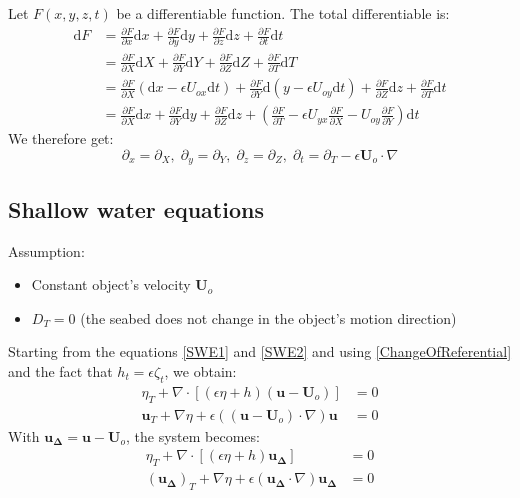 \documentclass[11pt,a4paper]{article}
\begin{document}
	Let $F(x,y,z,t)$ be a differentiable function. The total differentiable is: 
	\begin{align*}
		\mathrm{d}F &= \frac{\partial F}{\partial x} \mathrm{d}x + \frac{\partial F}{\partial y} \mathrm{d}y + \frac{\partial F}{\partial z} \mathrm{d}z + \frac{\partial F}{\partial t} \mathrm{d}t \\
		&= \frac{\partial F}{\partial X} \mathrm{d}X + \frac{\partial F}{\partial Y} \mathrm{d}Y + \frac{\partial F}{\partial Z} \mathrm{d}Z + \frac{\partial F}{\partial T} \mathrm{d}T	\\
		&= \frac{\partial F}{\partial X} (\mathrm{d}x - \epsilon U_{ox} \mathrm{d}t) + \frac{\partial F}{\partial Y} \mathrm{d}(y - \epsilon U_{oy} \mathrm{d}t) + \frac{\partial F}{\partial Z} \mathrm{d}z + \frac{\partial F}{\partial T} \mathrm{d}t\\
		&= \frac{\partial F}{\partial X} \mathrm{d}x + \frac{\partial F}{\partial Y} \mathrm{d}y + \frac{\partial F}{\partial Z} \mathrm{d}z + (\frac{\partial F}{\partial T} -\epsilon U_{yx}\frac{\partial F}{\partial X} - U_{oy}\frac{\partial F}{\partial Y})\mathrm{d}t
	\end{align*}
	We therefore get:
	\begin{equation}
		\partial_x = \partial_X, \;
		\partial_y = \partial_Y, \;
		\partial_z = \partial_Z, \;
		\partial_t = \partial_T - \epsilon \mathbf{U}_o \cdot \nabla \label{ChangeOfReferential}
	\end{equation}
	
		\subsection{Shallow water equations}
		Assumption: 
		\begin{itemize}
			\item Constant object's velocity $\mathbf{U}_o$
			\item $D_T = 0$ (the seabed does not change in the object's motion direction)
		\end{itemize}
		Starting from the equations \eqref{SWE1} and \eqref{SWE2} and using \eqref{ChangeOfReferential} and the fact that $h_t = \epsilon \zeta_t$, we obtain:
		\begin{align}
			\eta_T + \nabla \cdot [(\epsilon \eta + h)(\mathbf{u} - \mathbf{U}_o)] &= 0 \\
			\mathbf{u}_T + \nabla \eta		+ \epsilon ((\mathbf{u} - \mathbf{U}_o)\cdot \nabla) \mathbf{u} &= 0
		\end{align}
		With $\mathbf{u_\Delta} = \mathbf{u} - \mathbf{U}_o$, the system becomes:
		\begin{align}
			\eta_T + \nabla \cdot [(\epsilon \eta + h)\mathbf{u_\Delta}] &= 0 \\
			(\mathbf{u_\Delta})_T + \nabla \eta		+ \epsilon (\mathbf{u_\Delta}\cdot \nabla) \mathbf{u_\Delta} &= 0
		\end{align}
		
\end{document}
